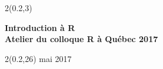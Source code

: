 \begin{frame}[plain]
  \begin{textblock*}{2\TPHorizModule}(0.2\TPHorizModule,3\TPVertModule)
    \raggedright%
    \bfseries
    \fontsize{30}{30}\selectfont
    Introduction à R \\
    \mdseries
    \fontsize{14}{18}\selectfont
    Atelier du colloque R à Québec 2017 \\
  \end{textblock*}

  \begin{textblock*}{2\TPHorizModule}(0.2\TPHorizModule,26\TPVertModule)
    \fontsize{10}{12} mai 2017
  \end{textblock*}
\end{frame}
\endgroup

